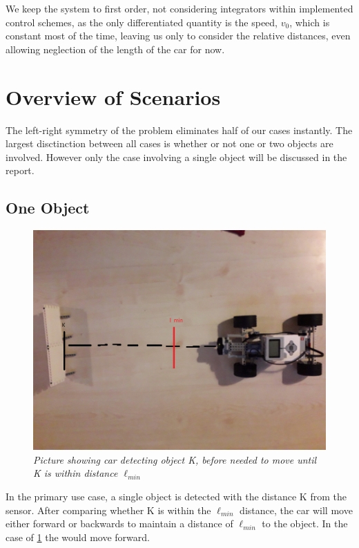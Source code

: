 \documentclass[a4paper,onecolumn,amsmath,amssymb]{revtex4-1}
\begin{document}
We keep the system to first order, not considering integrators within implemented control schemes, as the only differentiated quantity is the speed, $v_0$, which is constant most of the time,  leaving us only to consider the relative distances, even allowing neglection of the length of the car for now. 

\section{\textbf{Overview of Scenarios}}

The left-right symmetry of the problem eliminates half of our cases instantly. The largest disctinction between all cases is whether or not one or two objects are involved. However only the case involving a single object will be discussed in the report.\\
\subsection{\textbf{One  Object}}
\begin{figure}
	\includegraphics[width=\textwidth]{useCase1.png}
	\caption{\textit{Picture showing car detecting object K, before needed to move until K is within distance $\ell_{min}$ }\label{fig:usecase1picture}}
\end{figure}
\FloatBarrier

In the primary use case, a single object is detected with the distance K from the sensor. After comparing whether K is within the $\ell_{min}$ distance, the car will  move either forward or backwards to maintain a distance of $\ell_{min}$ to the object. In the case of \ref{fig:usecase1picture} the would move forward.
\end{document}
